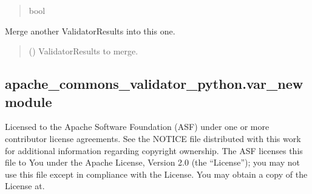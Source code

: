 \documentclass[letterpaper,10pt,english]{sphinxmanual}
\begin{document}
\begin{fulllineitems}
\begin{fulllineitems}
\begin{quote}
\begin{description}
\sphinxAtStartPar
bool

\end{description}\end{quote}

\end{fulllineitems}


\begin{fulllineitems}
\label{\detokenize{apache_commons_validator_python:apache_commons_validator_python.validator_results_new.ValidatorResults.merge}}
\pysigstartsignatures
{}
\pysigstopsignatures
\sphinxAtStartPar
Merge another ValidatorResults into this one.
\begin{quote}\begin{description}
\sphinxAtStartPar
{} ({\hyperref[\detokenize{apache_commons_validator_python:apache_commons_validator_python.validator_results_new.ValidatorResults}]{}}) \textendash{} ValidatorResults to merge.

\end{description}\end{quote}

\end{fulllineitems}


\end{fulllineitems}



\subsection{apache\_commons\_validator\_python.var\_new module}
\label{\detokenize{apache_commons_validator_python:module-apache_commons_validator_python.var_new}}\label{\detokenize{apache_commons_validator_python:apache-commons-validator-python-var-new-module}}
\sphinxAtStartPar
Licensed to the Apache Software Foundation (ASF) under one or more contributor
license agreements.  See the NOTICE file distributed with this work for additional
information regarding copyright ownership. The ASF licenses this file to You under the
Apache License, Version 2.0 (the “License”); you may not use this file except in
compliance with the License.  You may obtain a copy of the License at.
\end{document}
